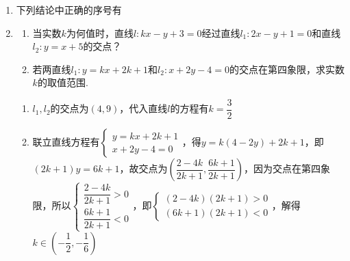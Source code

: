 \begin{enumerate}
    \item 下列结论中正确的序号有
    
    \item 
    \begin{enumerate}
        \item 当实数$k$为何值时，直线$l: kx-y+3 = 0$经过直线$l_1:2x-y+1=0$和直线$l_2:y=x+5$的交点？
        \item 若两直线$l_1:y = kx+2k+1$和$l_2:x+2y-4=0$的交点在第四象限，求实数$k$的取值范围.
    \end{enumerate}
    \begin{jieda}
        \begin{enumerate}
            \item $l_1, l_2$的交点为$(4, 9)$，代入直线$l$的方程有$k = \dfrac{3}{2}$
            \item 联立直线方程有$\left\{\begin{array}{l}
                 y = kx+2k+1 \\
                 x+2y-4=0 
            \end{array} \right.$，得$y = k(4-2y)+2k+1$，即$(2k+1)y = 6k+1$，故交点为$\left(\dfrac{2-4k}{2k+1}, \dfrac{6k+1}{2k+1}\right)$，因为交点在第四象限，所以$\left\{\begin{array}{l}
                 \dfrac{2-4k}{2k+1} > 0 \\
                 \dfrac{6k+1}{2k+1} < 0
            \end{array} \right.$，即$\left\{\begin{array}{l}
                 (2-4k)(2k+1) > 0 \\
                 (6k+1)(2k+1) < 0
            \end{array} \right.$，解得$k \in \left(-\dfrac{1}{2}, -\dfrac{1}{6}\right)$
        \end{enumerate}
    \end{jieda}
    

\end{enumerate}
